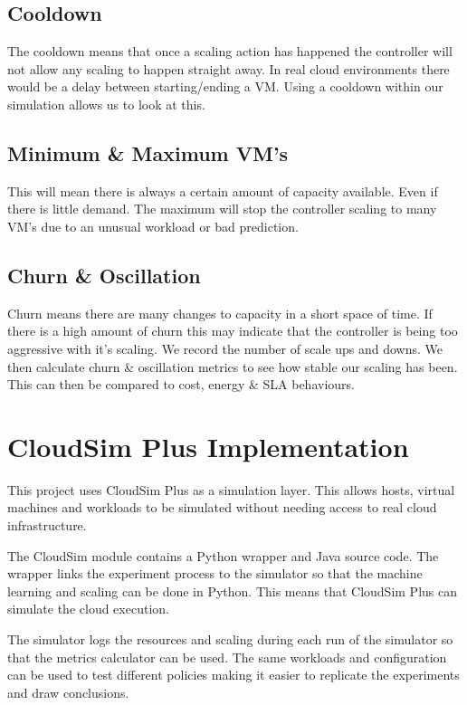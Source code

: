 \documentclass[10pt,journal,compsoc]{IEEEtran}
\begin{document}
\subsection{Cooldown}
The cooldown means that once a scaling action has happened the controller will not allow any scaling to happen straight away. In real cloud environments there would be a delay between starting/ending a VM. Using a cooldown within our simulation allows us to look at this.

\subsection{Minimum \& Maximum VM's}
This will mean there is always a certain amount of capacity available. Even if there is little demand. The maximum will stop the controller scaling to many VM's due to an unusual workload or bad prediction.

\subsection{Churn \& Oscillation}
Churn means there are many changes to capacity in a short space of time. If there is a high amount of churn this may indicate that the controller is being too aggressive with it's scaling. We record the number of scale ups and downs. We then calculate churn \& oscillation metrics to see how stable our scaling has been. This can then be compared to cost, energy \& SLA behaviours.

\section{CloudSim Plus Implementation}
This project uses CloudSim Plus as a simulation layer. This allows hosts, virtual machines and workloads to be simulated without needing access to real cloud infrastructure.

The CloudSim module contains a Python wrapper and Java source code. The wrapper links the experiment process to the simulator so that the machine learning and scaling can be done in Python. This means that CloudSim Plus can simulate the cloud execution.

The simulator logs the resources and scaling during each run of the simulator so that the metrics calculator can be used. The same workloads and configuration can be used to test different policies making it easier to replicate the experiments and draw conclusions.
\end{document}
